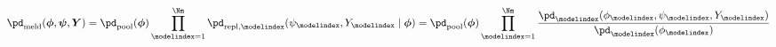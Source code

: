 \begin{equation}
  \pd_{\text{meld}}(\boldsymbol{\phi}, \boldsymbol{\psi}, \boldsymbol{Y}) =
    \pd_{\text{pool}}(\boldsymbol{\phi})
    \prod_{\modelindex = 1}^{\Nm}
      \pd_{\text{repl}, \modelindex}(\psi_{\modelindex}, Y_{\modelindex} \mid \boldsymbol{\phi})
    =
    \pd_{\text{pool}}(\boldsymbol{\phi})
    \prod_{\modelindex =1}^{\Nm}
    \frac {
      \pd_{\modelindex}(\phi_{\modelindex}, \psi_{\modelindex}, Y_{\modelindex})
    } {
      \pd_{\modelindex}(\phi_{\modelindex})
    }
  \label{eqn:melded-model-full}
\end{equation}